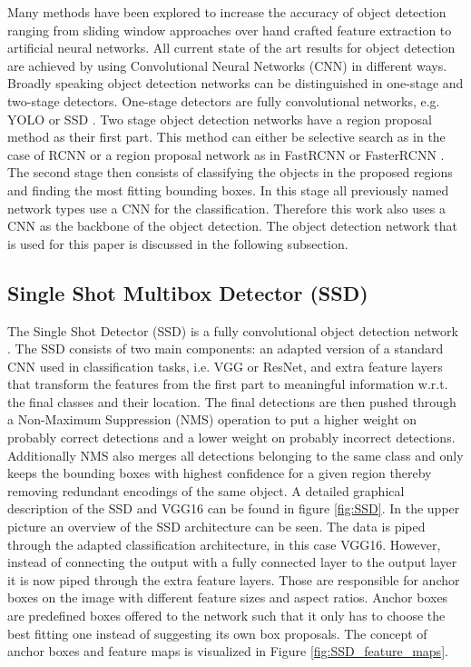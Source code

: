 Many methods have been explored to increase the accuracy of object detection ranging from sliding window approaches over hand crafted feature extraction to artificial neural networks. All current state of the art results for object detection are achieved by using Convolutional Neural Networks (CNN) in different ways. Broadly speaking object detection networks can be distinguished in one-stage and two-stage detectors. One-stage detectors are fully convolutional networks, e.g. YOLO \cite{yolo} or SSD \cite{SSD}. Two stage object detection networks have a region proposal method as their first part. This method can either be selective search as in the case of RCNN \cite{RCNN} or a region proposal network as in FastRCNN \cite{FastRCNN} or FasterRCNN \cite{FasterRCNN}. The second stage then consists of classifying the objects in the proposed regions and finding the most fitting bounding boxes. In this stage all previously named network types use a CNN for the classification. Therefore this work also uses a CNN as the backbone of the object detection. The object detection network that is used for this paper is discussed in the following subsection.

\subsection{Single Shot Multibox Detector (SSD)}

The Single Shot Detector (SSD) is a fully convolutional object detection network \cite{SSD}. The SSD consists of two main components: an adapted version of a standard CNN used in classification tasks, i.e. VGG or ResNet, and extra feature layers that transform the features from the first part to meaningful information w.r.t. the final classes and their location. The final detections are then pushed through a Non-Maximum Suppression (NMS) operation to put a higher weight on probably correct detections and a lower weight on probably incorrect detections. Additionally NMS also merges all detections belonging to the same class and only keeps the bounding boxes with highest confidence for a given region thereby removing redundant encodings of the same object. 
A detailed graphical description of the SSD and VGG16 can be found in figure \ref{fig:SSD}. In the upper picture an overview of the SSD architecture can be seen. The data is piped through the adapted classification architecture, in this case VGG16. However, instead of connecting the output with a fully connected layer to the output layer it is now piped through the extra feature layers. Those are responsible for anchor boxes on the image with different feature sizes and aspect ratios. Anchor boxes are predefined boxes offered to the network such that it only has to choose the best fitting one instead of suggesting its own box proposals. The concept of anchor boxes and feature maps is visualized in Figure \ref{fig:SSD_feature_maps}.

